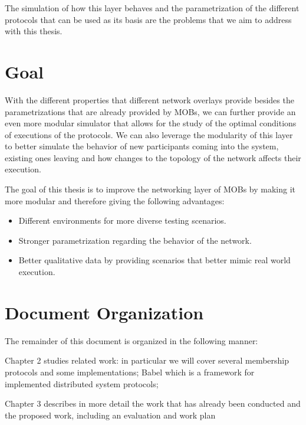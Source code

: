 The simulation of how this layer behaves and the parametrization of the different protocols that can be used as its basis are the
problems that we aim to address with this thesis.

\section{Goal}
\label{sub:goal}

With the different properties that different network overlays provide besides the parametrizations that are already provided by MOBs,
we can further provide an even more modular simulator that allows for the study of the optimal conditions of executions of the protocols.
We can also leverage the modularity of this layer to better simulate the behavior of new participants coming into the system, existing
ones leaving and how changes to the topology of the network affects their execution.

The goal of this thesis is to improve the networking layer of MOBs by making it more modular and therefore giving the following advantages:
\begin{itemize}
  \item Different environments for more diverse testing scenarios.
  \item Stronger parametrization regarding the behavior of the network.
  \item Better qualitative data by providing scenarios that better mimic real world execution.
\end{itemize}

\section{Document Organization}
\label{sub:document_organization}

The remainder of this document is organized in the following manner:

Chapter 2 studies related work: in particular we will cover several membership protocols and some implementations;
Babel which is a framework for implemented distributed system protocols;


Chapter 3 describes in more detail the work that has already been conducted and the
proposed work, including an evaluation and work plan